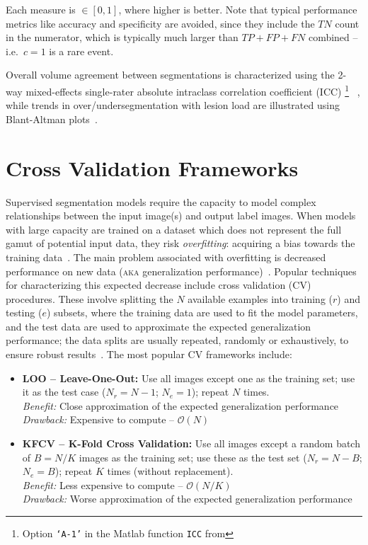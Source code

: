 Each measure is $\in [0,1]$, where higher is better.
Note that typical performance metrics like accuracy and specificity are avoided,
since they include the $TN$ count in the numerator,
which is typically much larger than $TP + FP + FN$ combined -- i.e.\ $c=1$ is a rare event.
\par
Overall volume agreement between segmentations is characterized using
the 2-way mixed-effects single-rater absolute intraclass correlation coefficient (ICC)%
\footnote{Option \texttt{`A-1'} in the Matlab function \texttt{ICC} from
  }%
~\cite{Koo2016}, while trends in over/undersegmentation with lesion load
are illustrated using Blant-Altman plots~\cite{Altman1983}.
\section{Cross Validation Frameworks}\label{s:cv-frameworks}
Supervised segmentation models require the capacity to model
complex relationships between the input image(s) and output label images.
When models with large capacity are trained on
a dataset which does not represent the full gamut of potential input data,
they risk \textit{overfitting}: acquiring a bias towards the training data~\cite{Hawkins2004}.
The main problem associated with overfitting is decreased performance on new data
(\textsc{aka} generalization performance)~\cite{Hawkins2004}.
Popular techniques for characterizing this expected decrease include
cross validation (CV) procedures.
These involve splitting the $N$ available examples into training ($r$) and testing ($e$) subsets,
where the training data are used to fit the model parameters,
and the test data are used to approximate the expected generalization performance;
the data splits are usually repeated, randomly or exhaustively,
to ensure robust results~\cite{Arlot2010}.
The most popular CV frameworks include:
\begin{itemize}
  \item\textbf{LOO -- Leave-One-Out:}
  Use all images except one as the training set;
  use it as the test case ($N_r = N-1$; $N_e = 1$);
  repeat $N$ times.
  \\\textit{Benefit:} Close approximation of the expected generalization performance
  \\\textit{Drawback:} Expensive to compute -- $\mathcal{O}(N)$
  \item\textbf{KFCV -- K-Fold Cross Validation:}
  Use all images except a random batch of $B = N/K$ images as the training set;
  use these as the test set ($N_r = N-B$; $N_e = B$);
  repeat $K$ times (without replacement).
  \\\textit{Benefit:} Less expensive to compute -- $\mathcal{O}(N/K)$
  \\\textit{Drawback:} Worse approximation of the expected generalization performance
\end{itemize}
